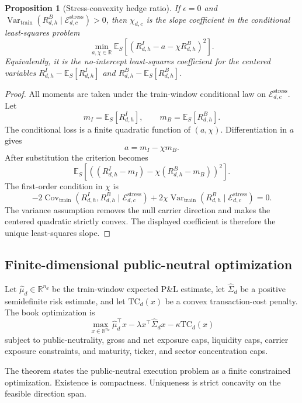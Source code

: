 \documentclass[11pt,a4paper]{amsart}
\theoremstyle{plain}
\newtheorem{proposition}[theorem]{Proposition}
\theoremstyle{definition}
\theoremstyle{remark}
\DeclareMathOperator{\Var}{Var}
\DeclareMathOperator{\Cov}{Cov}
\newcommand{\R}{\mathbb{R}}
\newcommand{\EE}{\mathbb{E}}
\newcommand{\cE}{\mathcal{E}}
\begin{document}
\begin{proposition}[Stress-convexity hedge ratio]\label{prop:stress-convexity}
If \(\epsilon=0\) and
\(\Var_{\mathrm{train}}(R^B_{d,h}\mid \cE_{d,c}^{\mathrm{stress}})>0\), then
\(\chi_{d,c}\) is the slope coefficient in the conditional least-squares problem
\[
        \min_{a,\chi\in\R}
        \EE_S\!\left[
        \left(R^I_{d,h}-a-\chi R^B_{d,h}\right)^2
        \right].
\]
Equivalently, it is the no-intercept least-squares coefficient for the centered variables
\(R^I_{d,h}-\EE_S[R^I_{d,h}]\) and \(R^B_{d,h}-\EE_S[R^B_{d,h}]\).
\end{proposition}

\begin{proof}
All moments are taken under the train-window conditional law on
\(\cE_{d,c}^{\mathrm{stress}}\).  Let
\[
        m_I=\EE_S[R^I_{d,h}],
        \qquad
        m_B=\EE_S[R^B_{d,h}].
\]
The conditional loss is a finite quadratic function of \((a,\chi)\).  Differentiation in \(a\)
gives
\[
        a=m_I-\chi m_B.
\]
After substitution the criterion becomes
\[
        \EE_S\!\left[
        \left((R^I_{d,h}-m_I)-\chi(R^B_{d,h}-m_B)\right)^2
        \right].
\]
The first-order condition in \(\chi\) is
\[
        -2\Cov_{\mathrm{train}}(R^I_{d,h},R^B_{d,h}\mid \cE_{d,c}^{\mathrm{stress}})
        +2\chi\Var_{\mathrm{train}}(R^B_{d,h}\mid \cE_{d,c}^{\mathrm{stress}})=0.
\]
The variance assumption removes the null carrier direction and makes the centered quadratic
strictly convex.  The displayed coefficient is therefore the unique least-squares slope.
\end{proof}

\subsection{Finite-dimensional public-neutral optimization}

Let \(\widehat\mu_d\in\R^{n_d}\) be the train-window expected P\&L estimate, let
\(\widehat\Sigma_d\) be a positive semidefinite risk estimate, and let
\(\mathrm{TC}_d(x)\) be a convex transaction-cost penalty.  The book optimization is
\[
        \max_{x\in\R^{n_d}}
        \widehat\mu_d^\top x
        -\lambda x^\top\widehat\Sigma_d x
        -\kappa\mathrm{TC}_d(x)
\]
subject to public-neutrality, gross and net exposure caps, liquidity caps, carrier exposure
constraints, and maturity, ticker, and sector concentration caps.

The theorem states the public-neutral execution problem as a finite constrained optimization.
Existence is compactness.  Uniqueness is strict concavity on the feasible direction span.
\end{document}
